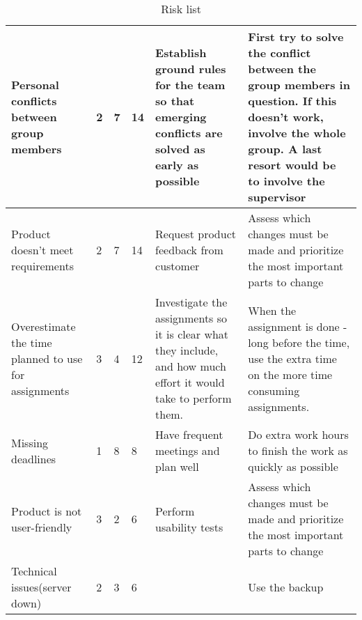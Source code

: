 \begin{table}[!h]
\begin{tabular}{ | p{3.5cm} | p{2cm} | p{1.5cm} | p{2cm} | p{3.5cm} | p{3.5cm} |}
			Personal conflicts between group members & 2 & 7 & 14 & Establish ground rules for the team so that emerging conflicts are solved as early as possible & First try to solve the conflict between the group members in question. If this doesn't work, involve the whole group. A last resort would be to involve the supervisor \\ \hline
			
			Product doesn't meet requirements & 2 & 7 & 14 & Request product feedback from customer & Assess which changes must be made and prioritize the most important parts to change \\ \hline
			
			Overestimate the time planned to use for assignments & 3 & 4 & 12 & Investigate the assignments so it is clear what they include, and how much effort it would take to perform them. & When the assignment is done - long before the time, use the extra time on the more time consuming assignments. \\ \hline
			
			Missing deadlines & 1 & 8 & 8 & Have frequent meetings and plan well & Do extra work hours to finish the work as quickly as possible \\ \hline
			
			Product is not user-friendly & 3 & 2 & 6 & Perform usability tests & Assess which changes must be made and prioritize the most important parts to change \\ \hline
			
			Technical issues(server down) & 2 & 3 & 6 & & Use the backup \\ \hline
		\end{tabular}
	\caption{Risk list}
	\label{Tab_risks}
\end{table}

\cleardoublepage